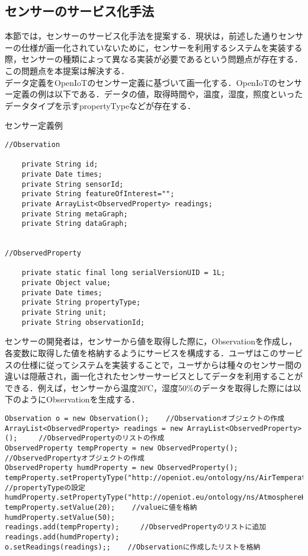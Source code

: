\documentclass{kuisthesis}			%
\begin{document}
\subsection{センサーのサービス化手法}
本節では，センサーのサービス化手法を提案する．現状は，前述した通りセンサーの仕様が画一化されていないために，センサーを利用するシステムを実装する際，センサーの種類によって異なる実装が必要であるという問題点が存在する．この問題点を本提案は解決する．
\\
データ定義をOpenIoTのセンサー定義に基づいて画一化する．OpenIoTのセンサー定義の例は以下である．データの値，取得時間や，温度，湿度，照度といったデータタイプを示すpropertyTypeなどが存在する．
\begin{itembox}[l]{センサー定義例}
\begin{verbatim}
//Observation

	private String id;	
	private Date times;	
	private String sensorId;
	private String featureOfInterest=""; 
	private ArrayList<ObservedProperty> readings;
	private String metaGraph;
	private String dataGraph;
	
	
//ObservedProperty

	private static final long serialVersionUID = 1L;
	private Object value;
	private Date times;
	private String propertyType;
	private String unit;
	private String observationId;
\end{verbatim}
\end{itembox}
センサーの開発者は，センサーから値を取得した際に，Observationを作成し，各変数に取得した値を格納するようにサービスを構成する．ユーザはこのサービスの仕様に従ってシステムを実装することで，ユーザからは種々のセンサー間の違いは隠蔽され，画一化されたセンサーサービスとしてデータを利用することができる．例えば，センサーから温度20℃，湿度50\%のデータを取得した際には以下のようにObservationを生成する．\\

\begin{lstlisting}
Observation o = new Observation();    //Observationオブジェクトの作成
ArrayList<ObservedProperty> readings = new ArrayList<ObservedProperty>();     //ObservedPropertyのリストの作成
ObservedProperty tempProperty = new ObservedProperty();    //ObservedPropertyオブジェクトの作成
ObservedProperty humdProperty = new ObservedProperty();    
tempProperty.setPropertyType("http://openiot.eu/ontology/ns/AirTemperature");    　//propertyTypeの設定
humdProperty.setPropertyType("http://openiot.eu/ontology/ns/AtmosphereHumidity");
tempProperty.setValue(20);    //valueに値を格納
humdProperty.setValue(50);
readings.add(tempProperty);     //ObservedPropertyのリストに追加
readings.add(humdProperty);
o.setReadings(readings);;    //Observationに作成したリストを格納
\end{lstlisting}
\end{document}
